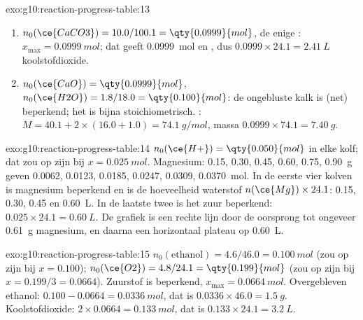\begin{solution}{exo:g10:reaction-progress-table:13}
\begin{enumerate}
  \item $n_0(\ce{CaCO3}) = 10.0 / 100.1 = \qty{0.0999}{mol}$, de enige
        : $x_{\max} = \qty{0.0999}{mol}$; dat geeft
        \qty{0.0999}{mol}  en , dus
        $0.0999 \times 24.1 = \qty{2.41}{L}$ koolstofdioxide.
  \item $n_0(\ce{CaO}) = \qty{0.0999}{mol}$, $n_0(\ce{H2O}) = 1.8 / 18.0
        = \qty{0.100}{mol}$: de ongebluste kalk is (net) beperkend; het
         is bijna stoichiometrisch. :
        $M = 40.1 + 2 \times (16.0 + 1.0) = \qty{74.1}{g/mol}$, massa
        $0.0999 \times 74.1 = \qty{7.40}{g}$.
\end{enumerate}
\end{solution}

\begin{solution}{exo:g10:reaction-progress-table:14}
$n_0(\ce{H+}) = \qty{0.050}{mol}$ in elke kolf; dat zou op zijn bij
$x = \qty{0.025}{mol}$. Magnesium: 0.15, 0.30, 0.45, 0.60, 0.75,
\qty{0.90}{g} geven 0.0062, 0.0123, 0.0185, 0.0247, 0.0309,
\qty{0.0370}{mol}. In de eerste vier kolven is magnesium beperkend en is
de hoeveelheid waterstof $n(\ce{Mg}) \times 24.1$: 0.15, 0.30, 0.45 en
\qty{0.60}{L}. In de laatste twee is het zuur beperkend: $0.025 \times 24.1
= \qty{0.60}{L}$. De grafiek is een rechte lijn door de oorsprong tot
ongeveer \qty{0.61}{g} magnesium, en daarna een horizontaal plateau op
\qty{0.60}{L}.
\end{solution}

\begin{solution}{exo:g10:reaction-progress-table:15}
$n_0(\text{ethanol}) = 4.6 / 46.0 = \qty{0.100}{mol}$ (zou op zijn bij
$x = 0.100$); $n_0(\ce{O2}) = 4.8 / 24.1 = \qty{0.199}{mol}$ (zou op zijn
bij $x = 0.199/3 = 0.0664$). Zuurstof is beperkend,
$x_{\max} = \qty{0.0664}{mol}$. Overgebleven ethanol: $0.100 - 0.0664 =
\qty{0.0336}{mol}$, dat is $0.0336 \times 46.0 = \qty{1.5}{g}$.
Koolstofdioxide: $2 \times 0.0664 = \qty{0.133}{mol}$, dat is
$0.133 \times 24.1 = \qty{3.2}{L}$.
\end{solution}

